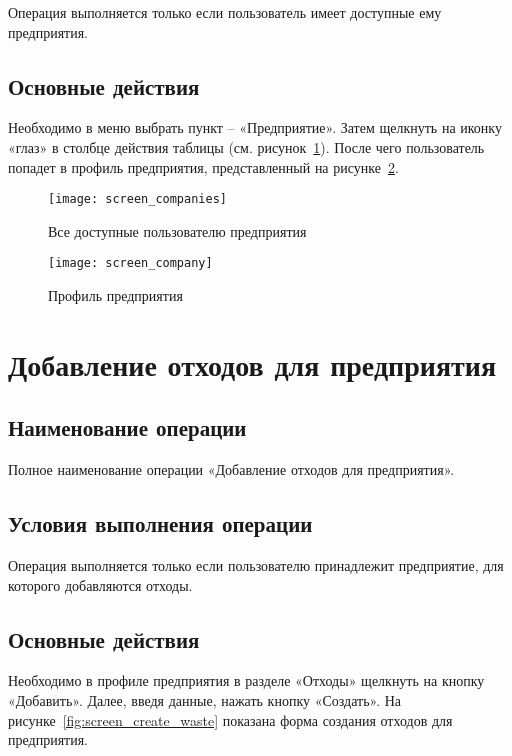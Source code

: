 \documentclass[a4paper]{G2-105}
\begin{document}
Операция выполняется только если пользователь имеет доступные ему предприятия.

\subsection{Основные действия}

Необходимо в меню выбрать пункт -- «Предприятие». Затем щелкнуть на иконку «глаз» в столбце действия таблицы (см. рисунок~\ref{fig:screen_companies}). После чего пользователь попадет в профиль предприятия, представленный на рисунке~\ref{fig:screen_company}.

\begin{figure}[H]
\centering
\texttt{[image: screen\_companies]}
\caption{Все доступные пользователю предприятия}
\label{fig:screen_companies}
\end{figure}

\begin{figure}[H]
\centering
\texttt{[image: screen\_company]}
\caption{Профиль предприятия}
\label{fig:screen_company}
\end{figure}

\section{Добавление отходов для предприятия}

\ttl

\subsection{Наименование операции}

Полное наименование операции «Добавление отходов для предприятия».

\subsection{Условия выполнения операции}

Операция выполняется только если пользователю принадлежит предприятие, для которого добавляются отходы.

\subsection{Основные действия}

Необходимо в профиле предприятия в разделе «Отходы» щелкнуть на кнопку «Добавить». Далее, введя данные, нажать кнопку «Создать». На рисунке~\ref{fig:screen_create_waste} показана форма создания отходов для предприятия.
\end{document}
